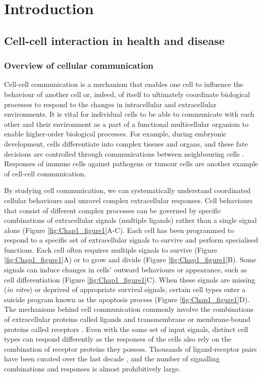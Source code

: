 \chapter[Introduction]{Introduction}
\label{Chap:Intro}


\section{Cell-cell interaction in health and disease}

\subsection{Overview of cellular communication}
Cell-cell communication is a mechanism that enables one cell to influence the behaviour of another cell or, indeed, of itself to ultimately coordinate biological processes to respond to the changes in intracellular and extracellular environments. It is vital for individual cells to be able to communicate with each other and their environment as a part of a functional multicellular organism to enable higher-order biological processes. For example, during embryonic development, cells differentiate into complex tissues and organs, and these fate decisions are controlled through communications between neighbouring cells \cite{gale1996eph, eichmann1997ligand}. Responses of immune cells against pathogens or tumour cells are another example of cell-cell communication. 

By studying cell communication, we can systematically understand coordinated cellular behaviours and unravel complex extracellular responses. Cell behaviours that consist of different complex processes can be governed by specific combinations of extracellular signals (multiple ligands) rather than a single signal alone (Figure \ref{fig:Chap1_figure1}A-C). Each cell has been programmed to respond to a specific set of extracellular signals to survive and perform specialised functions. Each cell often requires multiple signals to survive (Figure \ref{fig:Chap1_figure1}A) or to grow and divide (Figure \ref{fig:Chap1_figure1}B). Some signals can induce changes in cells' outward behaviours or appearance, such as cell differentiation (Figure \ref{fig:Chap1_figure1}C). When these signals are missing (\ie \textit{in vitro}) or deprived of appropriate survival signals, certain cell types enter a suicide program known as the apoptosis process (Figure \ref{fig:Chap1_figure1}D). The mechanisms behind cell communication commonly involve the combinations of extracellular proteins called ligands and transmembrane or membrane-bound proteins called receptors \cite{alberts2018molecular}. Even with the same set of input signals, distinct cell types can respond differently as the responses of the cells also rely on the combination of receptor proteins they possess. Thousands of ligand-receptor pairs have been curated over the last decade \cite{salwinski2004database, orchard2012protein}, and the number of signalling combinations and responses is almost prohibitively large.

